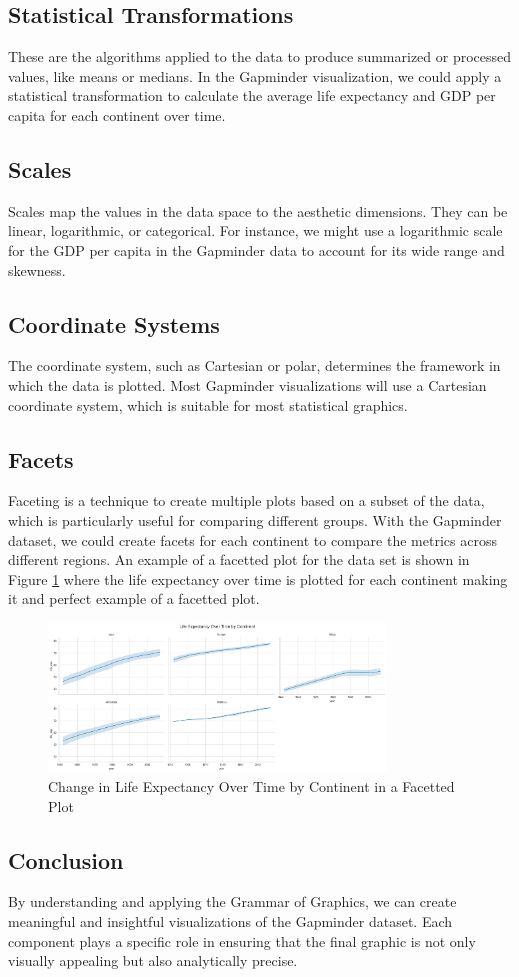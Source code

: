 \subsection{Statistical Transformations}
These are the algorithms applied to the data to produce summarized or processed values, like means or medians. In the Gapminder visualization, we could apply a statistical transformation to calculate the average life expectancy and GDP per capita for each continent over time.

\subsection{Scales}
Scales map the values in the data space to the aesthetic dimensions. They can be linear, logarithmic, or categorical. For instance, we might use a logarithmic scale for the GDP per capita in the Gapminder data to account for its wide range and skewness.

\subsection{Coordinate Systems}
The coordinate system, such as Cartesian or polar, determines the framework in which the data is plotted. Most Gapminder visualizations will use a Cartesian coordinate system, which is suitable for most statistical graphics.

\subsection{Facets}
Faceting is a technique to create multiple plots based on a subset of the data, which is particularly useful for comparing different groups. With the Gapminder dataset, we could create facets for each continent to compare the metrics across different regions.
An example of a facetted plot for the data set is shown in Figure \ref{fig:lo4_facet} where the life expectancy over time is plotted for each continent making it and perfect example of a facetted plot.

\begin{figure}[h]
    \centering
    \includegraphics[width=0.8\textwidth]{images/plots/lo4_life_expectancy_over_time_by_continent.png}
    \caption{Change in Life Expectancy Over Time by Continent in a Facetted Plot}
    \label{fig:lo4_facet}
\end{figure}

\subsection{Conclusion}
By understanding and applying the Grammar of Graphics, we can create meaningful and insightful visualizations of the Gapminder dataset. Each component plays a specific role in ensuring that the final graphic is not only visually appealing but also analytically precise.
